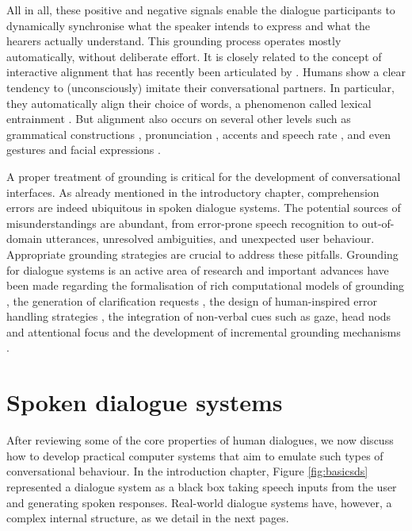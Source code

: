 All in all, these positive and negative signals enable the dialogue participants to dynamically synchronise what the speaker intends to express and what the hearers actually understand.   This grounding process operates mostly automatically, without deliberate effort.  It is closely related to the concept of interactive alignment that has recently been articulated by \cite{Garrod2004,Garrod2009}. Humans show a clear tendency to (unconsciously) imitate their conversational partners. In particular, they automatically align their choice of words, a phenomenon called lexical entrainment \citep{brennan1996conceptual}.  But alignment also occurs on several other levels such as grammatical constructions \citep{branigan2000syntactic}, pronunciation \citep{pardo2006phonetic}, accents and speech rate \citep{giles19911}, and even gestures and facial expressions \citep{bavelas1986show}.  

A proper treatment of grounding is critical for the development of conversational interfaces.  As already mentioned in the introductory chapter, comprehension errors are indeed ubiquitous in spoken dialogue systems.  The potential sources of misunderstandings are abundant, from error-prone speech recognition to out-of-domain utterances, unresolved ambiguities, and unexpected user behaviour.  Appropriate grounding strategies are crucial to address these pitfalls. Grounding for dialogue systems is an active area of research and important advances have been made regarding the formalisation of rich computational models of grounding \citep{Traum:1994thesis,MathesonPT00}, the generation of clarification requests \citep{Purver04Thesis,Rieser:2005}, the design of human-inspired error handling strategies \citep{Skantze2007}, the integration of non-verbal cues such as gaze, head nods and attentional focus \citep{Nakano:2003} and the development of incremental grounding mechanisms \citep{visser_toward_2012}.

\section{Spoken dialogue systems}
\label{sec:sds}
After reviewing some of the core properties of human dialogues, we now discuss how to develop practical computer systems that aim to emulate such types of conversational behaviour.   In the introduction chapter, Figure \ref{fig:basicsds} represented a dialogue system as a black box taking speech inputs from the user and generating spoken responses.  Real-world dialogue systems have, however, a complex internal structure, as we detail in the next pages.

